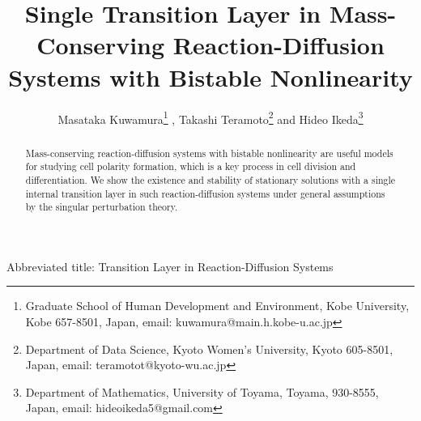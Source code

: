 \documentclass[a4,10pt]{article}
\begin{document}
\setlength{\baselineskip}{15pt} %
\def\pot{\mathaccent"7017} %
\makeatletter
 \renewcommand{\theequation}{%
  \thesection.\arabic{equation}}
\makeatother


\newtheorem{remark}{Remark}[section]
\newtheorem{theo}{Theorem}[section]
\newtheorem{lemma}{Lemma}[section]
\newtheorem{prop}{Proposition}[section]
\newtheorem{assume}{Assumption}[section]
\newtheorem{cor}{Corollary}[section]
\newtheorem{example}{Example}[section]

\def\ep{\varepsilon}
\def\ov{\overline}
\def\un{\underline}
\def\del{\partial}
\def\norm{\parallel}
\def\no{\noindent}
\def\lam{\lambda}
\def\dis{\displaystyle}
\def\bhat{\widehat}
\def\lap{\bigtriangleup}
\def\R{\mbox{\bf R}}
\def\C{\mbox{\bf C}}
\def\lg{\langle}
\def\rg{\rangle}

\newcommand{\Qed}{ $\square$ }



\title{
Single Transition Layer in Mass-Conserving Reaction-Diffusion 
Systems with Bistable Nonlinearity
}



\author{
Masataka Kuwamura\thanks{
Graduate School of Human Development and Environment,
Kobe University, Kobe 
657-8501, Japan,
email: kuwamura@main.h.kobe-u.ac.jp }\;
,
Takashi Teramoto\thanks{
Department of Data Science, Kyoto Women's University, Kyoto 605-8501, Japan, 
email: teramotot@kyoto-wu.ac.jp}\;
and
Hideo Ikeda\thanks{
Department of Mathematics, University of Toyama, Toyama,
930-8555, Japan,
email: hideoikeda5@gmail.com}
}


\date{}


\maketitle
\begin{abstract}
Mass-conserving reaction-diffusion 
systems with bistable nonlinearity
are useful models for studying cell polarity formation,
which is a key process in cell division and differentiation.
We show the existence and stability of stationary solutions with a
single internal transition layer in such reaction-diffusion systems
under general assumptions by the singular perturbation theory.
\end{abstract}

\vspace{1ex}

Abbreviated title:  Transition Layer in Reaction-Diffusion Systems
\end{document}

